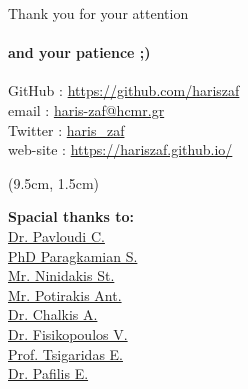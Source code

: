 \documentclass{beamer}
\begin{document}
   \begin{darkframes}

   \begin{frame}{Thank you for your attention}

      \framesubtitle{and your patience ;)}
      GitHub   : \href{https://github.com/hariszaf}{https://github.com/hariszaf} \\
      email    : \href{haris-zaf@hcmr.gr}{haris-zaf@hcmr.gr} \\
      Twitter  : \href{https://twitter.com/haris_zaf}{haris\_zaf} \\
      web-site : \url{https://hariszaf.github.io/} \\
      

      \begin{textblock*}{4.0cm}(9.5cm, 1.5cm)

         \footnotesize \textbf{Spacial thanks to:} \\

         \footnotesize \href{https://cpavloud.github.io/mysite/projects/}{Dr. Pavloudi C.} \\ 
         \footnotesize \href{https://imbbc.hcmr.gr/user/s-paragkamian/}{PhD Paragkamian S.} \\
         \footnotesize \href{https://imbbc.hcmr.gr/user/sninidakis/}{Mr. Ninidakis St.} \\
         \footnotesize \href{https://imbbc.hcmr.gr/user/potant/}{Mr. Potirakis Ant.} \\
         \footnotesize \href{https://tolischal.github.io/}{Dr. Chalkis A.} \\
         \footnotesize \href{https://vissarion.github.io/}{Dr. Fisikopoulos V.} \\ 
         \footnotesize \href{https://who.paris.inria.fr/Elias.Tsigaridas/}{Prof. Tsigaridas E.} \\
         \footnotesize \href{http://lab42open.hcmr.gr/people/evangelospafilis/}{Dr. Pafilis E.} \\
         

\end{textblock*}
\end{frame}
\end{darkframes}
\end{document}
